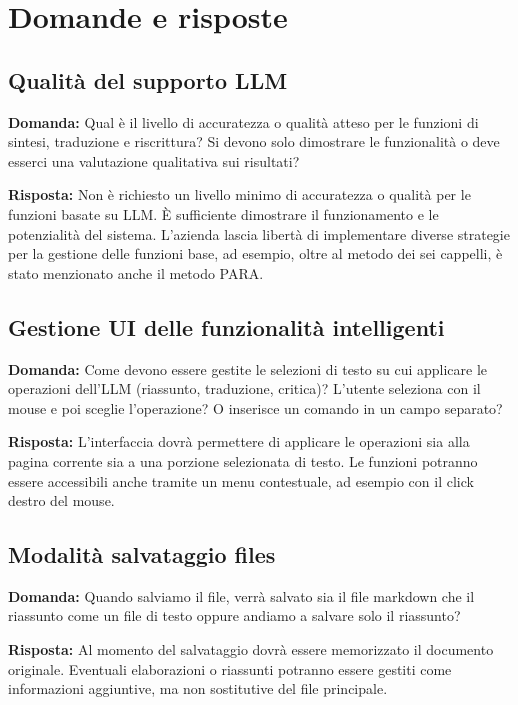 \documentclass[a4paper,12pt]{article}
\begin{document}
\section{Domande e risposte}{

    \subsection{Qualità del supporto LLM}
    \textbf{Domanda:} Qual è il livello di accuratezza o qualità atteso per le funzioni di sintesi, traduzione e riscrittura? Si devono solo dimostrare le funzionalità o deve esserci una valutazione qualitativa sui risultati?

    \textbf{Risposta:} Non è richiesto un livello minimo di accuratezza o qualità per le funzioni basate su LLM. È sufficiente dimostrare il funzionamento e le potenzialità del sistema. L'azienda lascia libertà di implementare diverse strategie per la gestione delle funzioni base, ad esempio, oltre al metodo dei sei cappelli, è stato menzionato anche il metodo PARA.

    \subsection{Gestione UI delle funzionalità intelligenti}
    \textbf{Domanda:} Come devono essere gestite le selezioni di testo su cui applicare le operazioni dell'LLM (riassunto, traduzione, critica)? L'utente seleziona con il mouse e poi sceglie l'operazione? O inserisce un comando in un campo separato?

    \textbf{Risposta:} L'interfaccia dovrà permettere di applicare le operazioni sia alla pagina corrente sia a una porzione selezionata di testo. Le funzioni potranno essere accessibili anche tramite un menu contestuale, ad esempio con il click destro del mouse.

    \subsection{Modalità salvataggio files}
    \textbf{Domanda:} Quando salviamo il file, verrà salvato sia il file markdown che il riassunto come un file di testo oppure andiamo a salvare solo il riassunto?

    \textbf{Risposta:} Al momento del salvataggio dovrà essere memorizzato il documento originale. Eventuali elaborazioni o riassunti potranno essere gestiti come informazioni aggiuntive, ma non sostitutive del file principale.

}
\end{document}
